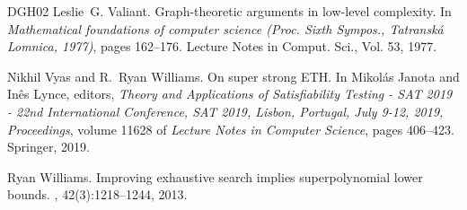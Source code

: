 \documentclass[10pt,a4paper]{article}
\begin{document}
\begin{thebibliography}{DGH{\etalchar{+}}02}
Leslie~G. Valiant.
\newblock Graph-theoretic arguments in low-level complexity.
\newblock In {\em Mathematical foundations of computer science ({P}roc. {S}ixth
  {S}ympos., {T}atransk\'{a} {L}omnica, 1977)}, pages 162--176. Lecture Notes
  in Comput. Sci., Vol. 53, 1977.

Nikhil Vyas and R.~Ryan Williams.
\newblock On super strong {ETH}.
\newblock In Mikol{\'{a}}s Janota and In{\^{e}}s Lynce, editors, {\em Theory
  and Applications of Satisfiability Testing - {SAT} 2019 - 22nd International
  Conference, {SAT} 2019, Lisbon, Portugal, July 9-12, 2019, Proceedings},
  volume 11628 of {\em Lecture Notes in Computer Science}, pages 406--423.
  Springer, 2019.

Ryan Williams.
\newblock Improving exhaustive search implies superpolynomial lower bounds.
, 42(3):1218--1244, 2013.

\end{thebibliography}
\end{document}
